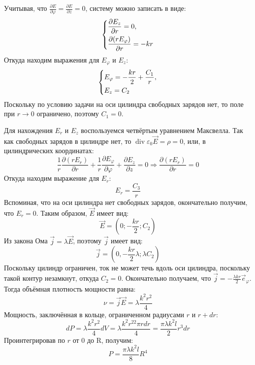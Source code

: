 \documentclass[11pt]{article}
\begin{document}
Учитывая, что \(\frac{\partial E}{\partial\varphi} = \frac{\partial E}{\partial z} = 0\), систему можно записать в
виде:
\begin{equation*}
\begin{dcases}
\frac{\partial E_z}{\partial r} = 0, \\
\frac{\partial (rE_\varphi)}{\partial r} = -kr
\end{dcases}
\end{equation*}
Откуда находим выражения для \(E_\varphi\) и \(E_z\):
\begin{equation}
\begin{dcases}
E_\varphi = -\frac{kr}2 + \frac{C_1}r, \\
E_z = C_2
\end{dcases}
\end{equation}
Поскольку по условию задачи на оси цилиндра свободных зарядов нет, то поле при \(r \to 0\) ограничено, поэтому
\(C_1 = 0\).

Для нахождения \(E_r\) и \(E_z\) воспользуемся четвёртым уравнением Максвелла. Так как свободных зарядов в цилиндре
нет, то \(\operatorname{div}\varepsilon_0\vec E = \rho = 0\), или, в цилиндрических координатах:
\begin{equation*}
\frac{1}r\frac{\partial(rE_r)}{\partial r} + \frac{1}r\frac{\partial E_\varphi}{\partial \varphi}
+ \frac{\partial E_z}{\partial z} = 0 \Rightarrow \frac{\partial (rE_r)}{\partial r} = 0
\end{equation*}
Откуда находим выражение для \(E_r\):
\begin{equation}
E_r = \frac{C_3}r
\end{equation}
Вспоминая, что на оси цилиндра нет свободных зарядов, окончательно получим, что \(E_r = 0\). Таким образом, \(\vec E\)
имеет вид:
\begin{equation}
\vec E = (0; -\frac{kr}2; C_2)
\end{equation}
Из закона Ома \(\vec j = \lambda\vec E\), поэтому \(\vec j\) имеет вид:
\begin{equation}
\vec j = (0, -\frac{kr}2\lambda; \lambda C_2)
\end{equation}
Поскольку цилиндр ограничен, ток не может течь вдоль оси цилиндра, поскольку такой контур незамкнут, откуда \(C_2 = 0\).
Окончательно получаем, что \(\vec j = -\frac{\lambda kr}2\vec e_\varphi\). Тогда объёмная плотность мощности равна:
$$\nu = \vec j \vec E = \lambda\frac{k^2r^2}4$$
Мощность, заключённая в кольце, ограниченном радиусами \(r\) и \(r + dr\):
$$dP = \lambda\frac{k^2r^2}4dV = \lambda\frac{k^2r^22\pi rdr}4 = \frac{\pi\lambda k^2l}2r^3dr$$
Проинтегрировав по \(r\) от 0 до R, получим:
$$P = \frac{\pi\lambda k^2l}8R^4$$
\end{document}
